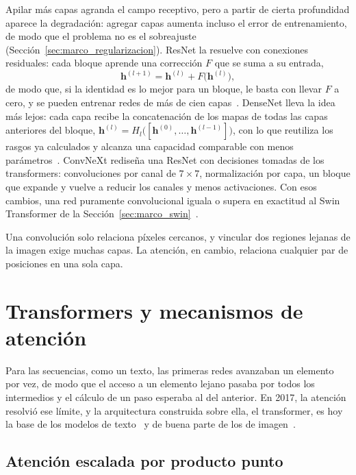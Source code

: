 Apilar más capas agranda el campo receptivo, pero a partir de cierta profundidad aparece la degradación:
agregar capas aumenta incluso el error de entrenamiento, de modo que el problema no es el sobreajuste
(Sección~\ref{sec:marco_regularizacion}). ResNet la resuelve con conexiones residuales: cada bloque aprende una
corrección $F$ que se suma a su entrada,
\begin{equation}
    \mathbf{h}^{(l+1)} = \mathbf{h}^{(l)} + F\bigl(\mathbf{h}^{(l)}\bigr),
    \label{eq:marco_residual}
\end{equation}
de modo que, si la identidad es lo mejor para un bloque, le basta con llevar $F$ a cero, y se pueden entrenar
redes de más de cien capas~\cite{he2015residual}. DenseNet lleva la idea más lejos: cada capa recibe la concatenación de
los mapas de todas las capas anteriores del bloque, $\mathbf{h}^{(l)} = H_l\bigl([\mathbf{h}^{(0)}, \dots,
\mathbf{h}^{(l-1)}]\bigr)$, con lo que reutiliza los rasgos ya calculados y alcanza una capacidad comparable con
menos parámetros~\cite{huang2018densely}. ConvNeXt rediseña una ResNet con decisiones tomadas de los
transformers: convoluciones por canal de $7 \times 7$, normalización por capa, un bloque que expande y vuelve a
reducir los canales y menos activaciones. Con esos cambios, una red puramente convolucional iguala o supera en exactitud
al Swin Transformer de la Sección~\ref{sec:marco_swin}~\cite{liu2022convnet}.

Una convolución solo relaciona píxeles cercanos, y vincular dos regiones lejanas de la imagen exige muchas
capas. La atención, en cambio, relaciona cualquier par de posiciones en una sola capa.

\section{Transformers y mecanismos de atención}
\label{sec:marco_atencion}

Para las secuencias, como un texto, las primeras redes avanzaban un elemento por vez, de modo que el acceso a un
elemento lejano pasaba por todos los intermedios y el cálculo de un paso esperaba al del anterior. En 2017, la
atención resolvió ese límite, y la arquitectura construida sobre ella, el transformer, es hoy la base de los
modelos de texto~\cite{vaswani2017attention} y de buena parte de los de imagen~\cite{dosovitskiy2021image}.

\subsection{Atención escalada por producto punto}
\label{sec:marco_atencion_producto}

